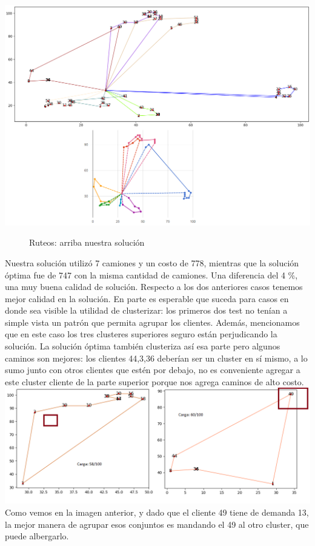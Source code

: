 \documentclass[11pt,a4paper]{article}
\begin{document}
\includegraphics[scale=.5]{graficos/B-n52-k7/caminos.png}
\begin{figure}[!h]
\caption{Ruteos: arriba nuestra solución}
\end{figure}

Nuestra solución utilizó 7 camiones y un costo de 778, mientras que la solución óptima fue de 747 con la misma cantidad de camiones. Una diferencia del 4 \%, una muy buena calidad de solución. Respecto a los dos anteriores casos tenemos mejor calidad en la solución. En parte es esperable que suceda para casos en donde sea visible la utilidad de clusterizar: los primeros dos test no tenían a simple vista un patrón que permita agrupar los clientes. Además, mencionamos que en este caso los tres clusteres superiores seguro están perjudicando la solución. La solución óptima también clusteriza así esa parte pero algunos caminos son mejores:  los clientes 44,3,36 deberían ser un cluster en sí mismo, a lo sumo junto con otros clientes que estén por debajo, no es conveniente agregar a este cluster cliente de la parte superior porque nos agrega caminos de alto costo.\\
\includegraphics[scale=.5]{graficos/B-n52-k7/prob_camino.png}
\\Como vemos en la imagen anterior, y dado que el cliente 49 tiene de demanda 13, la mejor manera de agrupar esos conjuntos es mandando el 49 al otro cluster, que puede albergarlo.
\end{document}
